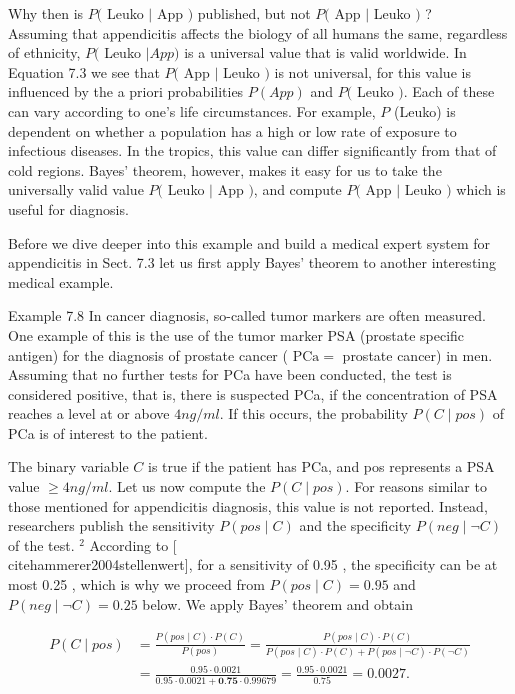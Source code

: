 \documentclass[10pt]{book}
\begin{document}
Why then is $P($ Leuko $\mid$ App $)$ published, but not $P($ App $\mid$ Leuko $)$ ?\\
Assuming that appendicitis affects the biology of all humans the same, regardless of ethnicity, $P($ Leuko $\mid A p p)$ is a universal value that is valid worldwide. In Equation 7.3 we see that $P($ App $\mid$ Leuko $)$ is not universal, for this value is influenced by the a priori probabilities $P(A p p)$ and $P($ Leuko $)$. Each of these can vary according to one's life circumstances. For example, $P$ (Leuko) is dependent on whether a population has a high or low rate of exposure to infectious diseases. In the tropics, this value can differ significantly from that of cold regions. Bayes' theorem, however, makes it easy for us to take the universally valid value $P($ Leuko $\mid$ App $)$, and compute $P($ App $\mid$ Leuko $)$ which is useful for diagnosis.

Before we dive deeper into this example and build a medical expert system for appendicitis in Sect. 7.3 let us first apply Bayes' theorem to another interesting medical example.

Example 7.8 In cancer diagnosis, so-called tumor markers are often measured. One example of this is the use of the tumor marker PSA (prostate specific antigen) for the diagnosis of prostate cancer ( $\mathrm{PCa}=$ prostate cancer) in men. Assuming that no further tests for PCa have been conducted, the test is considered positive, that is, there is suspected PCa, if the concentration of PSA reaches a level at or above $4 n g / m l$. If this occurs, the probability $P(C \mid p o s)$ of PCa is of interest to the patient.

The binary variable $C$ is true if the patient has PCa, and pos represents a PSA value $\geq 4 n g / m l$. Let us now compute the $P(C \mid p o s)$. For reasons similar to those mentioned for appendicitis diagnosis, this value is not reported. Instead, researchers publish the sensitivity $P(p o s \mid C)$ and the specificity $P(n e g \mid \neg C)$ of the test. ${ }^{2}$ According to [\\cite{hammerer2004stellenwert}], for a sensitivity of 0.95 , the specificity can be at most 0.25 , which is why we proceed from $P(p o s \mid C)=0.95$ and $P(n e g \mid \neg C)=0.25$ below. We apply Bayes' theorem and obtain


$$
\begin{aligned}
P(C \mid p o s) & =\frac{P(p o s \mid C) \cdot P(C)}{P(p o s)}=\frac{P(p o s \mid C) \cdot P(C)}{P(p o s \mid C) \cdot P(C)+P(p o s \mid \neg C) \cdot P(\neg C)} \\
& =\frac{0.95 \cdot 0.0021}{0.95 \cdot 0.0021+\mathbf{0 . 7 5} \cdot 0.99679}=\frac{0.95 \cdot 0.0021}{0.75}=0.0027 .
\end{aligned}
$$
\end{document}
